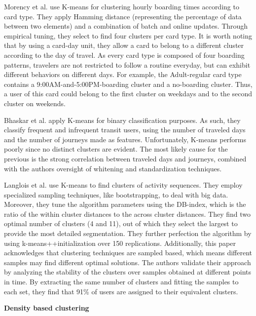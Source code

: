 \documentclass{article}
\begin{document}
Morency et al. use K-means for clustering hourly boarding times according to card type. They apply Hamming distance (representing the percentage of data between two elements) and a combination of batch and online updates. Through empirical tuning, they select to find four clusters per card type. It is worth noting that by using a card-day unit, they allow a card to belong to a different cluster according to the day of travel. As every card type is composed of four boarding patterns, travelers are not restricted to follow a routine everyday, but can exhibit different behaviors on different days. For example, the Adult-regular card type contains a 9:00AM-and-5:00PM-boarding cluster and a no-boarding cluster. Thus, a user of this card could belong to the first cluster on weekdays and to the second cluster on weekends.  \cite{morency2007measuring}

Bhaskar et al. apply K-means for binary classification purposes. As such, they classify frequent and infrequent transit users, using the number of traveled days and the number of journeys made as features. Unfortunately, K-means performs poorly since no distinct clusters are evident. The most likely cause for the previous is the strong correlation between traveled days and journeys, combined with the authors oversight of whitening and standardization techniques. \cite{bhaskar2015passenger}

Langlois et al. use K-means to find clusters of activity sequences. They employ specialized sampling techniques, like bootstrapping, to deal with big data.  Moreover, they tune the algorithm parameters using the DB-index, which is the ratio of the within cluster distances to the across cluster distances. They find two optimal number of clusters (4 and 11), out of which they select the largest to provide the most detailed segmentation. They further perfection the algorithm by using k-means++initialization over 150 replications. Additionally, this paper acknowledges that clustering techniques are sampled based, which means different samples may find different optimal solutions. The authors validate their approach by analyzing the stability of the clusters over samples obtained at different points in time. By extracting the same number of clusters and fitting the samples to each set, they find that 91\% of users are assigned to their equivalent clusters. \cite{langlois2016inferring}


\textbf{Density based clustering}
\end{document}
